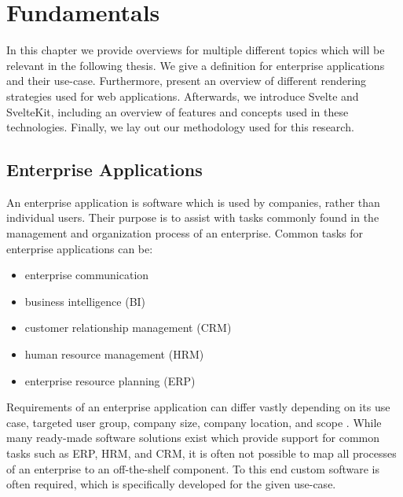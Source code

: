 \chapter{Fundamentals}
\label{ch:fundamentals}
In this chapter we provide overviews for multiple different topics which will be relevant in the following thesis. We give a definition for enterprise applications and their use-case. Furthermore, present an overview of different rendering strategies used for web applications. Afterwards, we introduce Svelte and SvelteKit, including an overview of features and concepts used in these technologies. Finally, we lay out our methodology used for this research.

\section{Enterprise Applications}
\label{sec:enterprise-applications}



An enterprise application is software which is used by companies, rather than individual users. Their purpose is to assist with tasks commonly found in the management and organization process of an enterprise. Common tasks for enterprise applications can be:
\begin{itemize}
    \item enterprise communication
    \item business intelligence (BI)
    \item customer relationship management (CRM)
    \item human resource management (HRM)
    \item enterprise resource planning (ERP)
\end{itemize}

Requirements of an enterprise application can differ vastly depending on its use case, targeted user group, company size, company location, and scope \cite{noauthor_what_nodate,beal_what_2010}. While many ready-made software solutions exist which provide support for common tasks such as ERP, HRM, and CRM, it is often not possible to map all processes of an enterprise to an off-the-shelf component. To this end custom software is often required, which is specifically developed for the given use-case.


